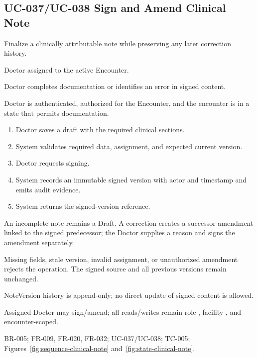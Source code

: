 \subsection{UC-037/UC-038 Sign and Amend Clinical Note}
\begin{description}[leftmargin=2.6cm,style=nextline]
\item[Goal] Finalize a clinically attributable note while preserving any later correction history.
\item[Primary actor] Doctor assigned to the active Encounter.
\item[Trigger] Doctor completes documentation or identifies an error in signed content.
\item[Preconditions] Doctor is authenticated, authorized for the Encounter, and the encounter is in a state that permits documentation.
\item[Main success flow]
\begin{enumerate}[leftmargin=1.4em]
  \item Doctor saves a draft with the required clinical sections.
  \item System validates required data, assignment, and expected current version.
  \item Doctor requests signing.
  \item System records an immutable signed version with actor and timestamp and emits audit evidence.
  \item System returns the signed-version reference.
\end{enumerate}
\item[Alternative flows] An incomplete note remains a Draft. A correction creates a successor amendment linked to the signed predecessor; the Doctor supplies a reason and signs the amendment separately.
\item[Exception flows] Missing fields, stale version, invalid assignment, or unauthorized amendment rejects the operation. The signed source and all previous versions remain unchanged.
\item[Postconditions and data] NoteVersion history is append-only; no direct update of signed content is allowed.
\item[Authorization] Assigned Doctor may sign/amend; all reads/writes remain role-, facility-, and encounter-scoped.
\item[Trace] BR-005; FR-009, FR-020, FR-032; UC-037/UC-038; TC-005; Figures~\ref{fig:sequence-clinical-note} and~\ref{fig:state-clinical-note}.
\end{description}

